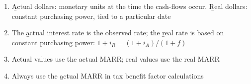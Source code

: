 \begin{enumerate}
    \item \b{Actual dollars}: monetary units at the time the cash-flows occur. \b{Real dollars}: constant purchasing power, tied to a particular date
    \item The \b{actual} interest rate is the observed rate; the \b{real} rate is based on constant purchasing power: $1 + i_R = (1 + i_A)/(1 + f)$
    \item Actual values use the actual MARR; real values use the real MARR
    \item Always use the \b{actual} MARR in tax benefit factor calculations
\end{enumerate}
